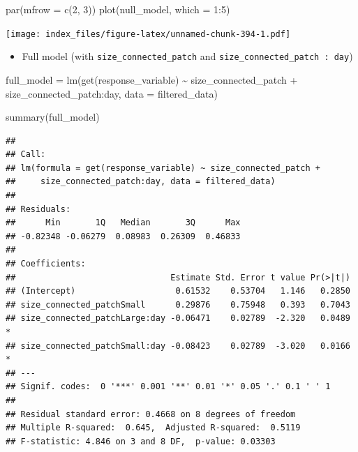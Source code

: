 \documentclass[
]{article}
\newenvironment{Shaded}{\begin{snugshade}}{\end{snugshade}}
\newcommand{\AttributeTok}[1]{\textcolor[rgb]{0.77,0.63,0.00}{#1}}
\newcommand{\DecValTok}[1]{\textcolor[rgb]{0.00,0.00,0.81}{#1}}
\newcommand{\FunctionTok}[1]{\textcolor[rgb]{0.00,0.00,0.00}{#1}}
\newcommand{\NormalTok}[1]{#1}
\newcommand{\OtherTok}[1]{\textcolor[rgb]{0.56,0.35,0.01}{#1}}
\newcommand{\SpecialCharTok}[1]{\textcolor[rgb]{0.00,0.00,0.00}{#1}}
\providecommand{\tightlist}{%
  \setlength{\itemsep}{0pt}\setlength{\parskip}{0pt}}
\begin{document}
\begin{Shaded}
\begin{Highlighting}[]
\FunctionTok{par}\NormalTok{(}\AttributeTok{mfrow =} \FunctionTok{c}\NormalTok{(}\DecValTok{2}\NormalTok{, }\DecValTok{3}\NormalTok{))}
\FunctionTok{plot}\NormalTok{(null\_model, }\AttributeTok{which =} \DecValTok{1}\SpecialCharTok{:}\DecValTok{5}\NormalTok{)}
\end{Highlighting}
\end{Shaded}

\texttt{[image: index\_files/figure-latex/unnamed-chunk-394-1.pdf]}

\begin{itemize}
\tightlist
\item
  Full model (with \texttt{size\_connected\_patch} and
  \texttt{size\_connected\_patch\ :\ day})
\end{itemize}

\begin{Shaded}
\begin{Highlighting}[]
\NormalTok{full\_model }\OtherTok{=} \FunctionTok{lm}\NormalTok{(}\FunctionTok{get}\NormalTok{(response\_variable) }\SpecialCharTok{\textasciitilde{}}
\NormalTok{                  size\_connected\_patch }\SpecialCharTok{+}
\NormalTok{                  size\_connected\_patch}\SpecialCharTok{:}\NormalTok{day,}
                \AttributeTok{data =}\NormalTok{ filtered\_data)}

\FunctionTok{summary}\NormalTok{(full\_model)}
\end{Highlighting}
\end{Shaded}

\begin{verbatim}
## 
## Call:
## lm(formula = get(response_variable) ~ size_connected_patch + 
##     size_connected_patch:day, data = filtered_data)
## 
## Residuals:
##      Min       1Q   Median       3Q      Max 
## -0.82348 -0.06279  0.08983  0.26309  0.46833 
## 
## Coefficients:
##                               Estimate Std. Error t value Pr(>|t|)  
## (Intercept)                    0.61532    0.53704   1.146   0.2850  
## size_connected_patchSmall      0.29876    0.75948   0.393   0.7043  
## size_connected_patchLarge:day -0.06471    0.02789  -2.320   0.0489 *
## size_connected_patchSmall:day -0.08423    0.02789  -3.020   0.0166 *
## ---
## Signif. codes:  0 '***' 0.001 '**' 0.01 '*' 0.05 '.' 0.1 ' ' 1
## 
## Residual standard error: 0.4668 on 8 degrees of freedom
## Multiple R-squared:  0.645,  Adjusted R-squared:  0.5119 
## F-statistic: 4.846 on 3 and 8 DF,  p-value: 0.03303
\end{verbatim}
\end{document}
